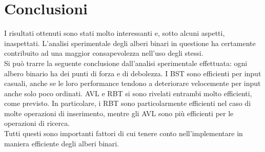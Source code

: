 \documentclass{article}
\begin{document}
	\section{Conclusioni}
	I risultati ottenuti sono stati molto interessanti e, sotto alcuni aspetti, inaspettati. L'analisi sperimentale degli alberi binari in questione ha certamente contribuito ad una maggior consapevolezza nell'uso degli stessi.
	\\
	Si può trarre la seguente conclusione dall'analisi sperimentale effettuata: ogni albero binario ha dei punti di forza e di debolezza. I BST sono efficienti per input casuali, anche se le loro performance tendono a deteriorare velocemente per input anche solo poco ordinati. AVL e RBT si sono rivelati entrambi molto efficienti, come previsto. In particolare, i RBT sono particolarmente efficienti nel caso di molte operazioni di inserimento, mentre gli AVL sono più efficienti per le operazioni di ricerca.\\
	
	Tutti questi sono importanti fattori di cui tenere conto nell'implementare in maniera efficiente degli alberi binari.
	
\end{document}
